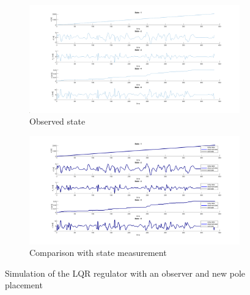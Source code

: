 \begin{figure}[H]
\begin{subfigure}[b]{0.8\textwidth}
         \centering
         \includegraphics[width=\textwidth]{Latex report/image/ex2/stateNewpole.png}
         \caption{Observed state}
         \label{fig:NPState}
     \end{subfigure}
     \begin{subfigure}[b]{0.8\textwidth}
         \centering
         \includegraphics[width=\textwidth]{Latex report/image/ex2/obsNewpole.png}
         \caption{Comparison with state measurement}
         \label{fig:NPObs}
     \end{subfigure}
    \caption{Simulation of the LQR regulator with an observer and new pole placement}
    \label{fig:NP}
\end{figure}

